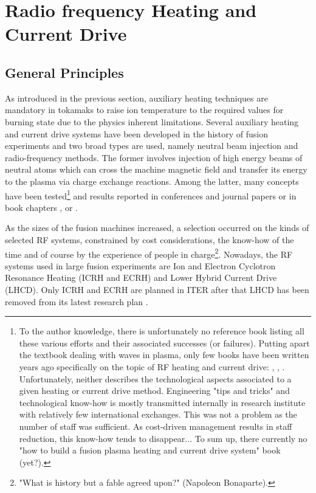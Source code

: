 
\section[RF Heating and Current Drive]{Radio frequency Heating and Current Drive}

\subsection{General Principles}
As introduced in the previous section, auxiliary heating techniques are mandatory in tokamaks to raise ion temperature to the required values for burning state due to the physics inherent limitations. Several auxiliary heating and current drive systems have been developed in the history of fusion experiments and two broad types are used, namely neutral beam injection and radio-frequency methods. %
The former involves  injection of high energy beams of neutral atoms which can cross the machine magnetic field and transfer its energy to the plasma via charge exchange reactions. Among the latter, many concepts have been tested\footnote{To the author knowledge, there is unfortunately no reference book listing all these various efforts and their associated successes (or failures). Putting apart the textbook dealing with waves in plasma, only few books have been written years ago specifically on the topic of RF heating and current drive: , , . Unfortunately, neither describes the technological aspects associated to a given heating or current drive method. Engineering "tips and tricks" and technological know-how is mostly transmitted internally in research institute with relatively few international exchanges. This was not a problem as the number of staff was sufficient. As cost-driven management results in staff reduction, this know-how tends to disappear... To sum up, there currently no "how to build a fusion plasma heating and current drive system" book (yet?).} and results reported in conferences and journal papers  or in book chapters \cite[§6]{kikuchi2012}, \cite[§15]{Freidberg2007} or \cite{hillairet2020-1}. 

As the sizes of the fusion machines increased, a selection occurred on the kinds of selected RF systems, constrained by cost considerations, the know-how of the time and of course by the experience of people in charge\footnote{"What is history but a fable agreed upon?" (Napoleon Bonaparte).}. Nowadays, the RF systems used in large fusion experiments are Ion and Electron Cyclotron Resonance Heating (ICRH and ECRH) and Lower Hybrid Current Drive (LHCD). Only ICRH and ECRH are planned in ITER after that LHCD has been removed from its latest research plan \cite{iterorganization2018}. 

